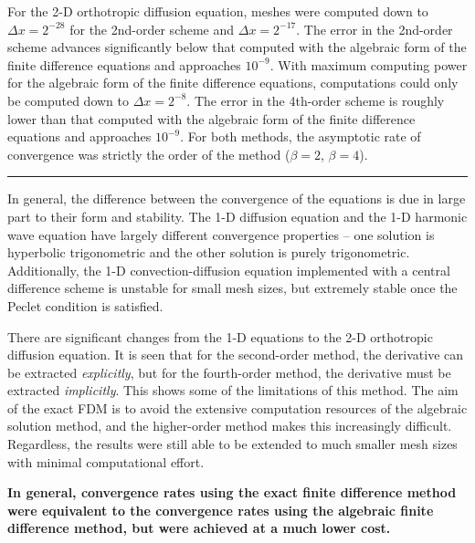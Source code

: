 \documentclass[10pt]{article}		%
\numberwithin{equation}{section}
\begin{document}
For the 2-D orthotropic diffusion equation, meshes were computed down to $\Delta x = 2^{-28}$ for the 2nd-order scheme and $\Delta x = 2^{-17}$. The error in the 2nd-order scheme advances significantly below that computed with the algebraic form of the finite difference equations and approaches $10^{-9}$. With maximum computing power for the algebraic form of the finite difference equations, computations could only be computed down to $\Delta x = 2^{-8}$. The error in the 4th-order scheme is roughly lower than that computed with the algebraic form of the finite difference equations and approaches $10^{-9}$. For both methods, the asymptotic rate of convergence was strictly the order of the method ($\beta = 2$, $\beta = 4$).

\vspace{10 pt}

\hrule

\vspace{10 pt}

In general, the difference between the convergence of the equations is due in large part to their form and stability. The 1-D diffusion equation and the 1-D harmonic wave equation have largely different convergence properties -- one solution is hyperbolic trigonometric and the other solution is purely trigonometric. Additionally, the 1-D convection-diffusion equation implemented with a central difference scheme is unstable for small mesh sizes, but extremely stable once the Peclet condition is satisfied.

\vspace{10 pt}

There are significant changes from the 1-D equations to the 2-D orthotropic diffusion equation. It is seen that for the second-order method, the derivative can be extracted \textit{explicitly}, but for the fourth-order method, the derivative must be extracted \textit{implicitly}. This shows some of the limitations of this method. The aim of the exact FDM is to avoid the extensive computation resources of the algebraic solution method, and the higher-order method makes this increasingly difficult. Regardless, the results were still able to be extended to much smaller mesh sizes with minimal computational effort.

\vspace{10 pt}

\textbf{In general, convergence rates using the exact finite difference method were equivalent to the convergence rates using the algebraic finite difference method, but were achieved at a much lower cost.}
\end{document}
